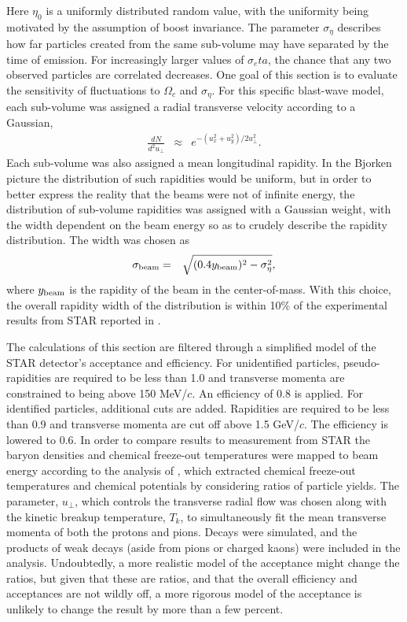 Here $\eta_0$ is a uniformly distributed random value, with the uniformity being motivated by the assumption of boost invariance. The parameter $\sigma_\eta$ describes how far particles created from the same sub-volume may have separated by the time of emission. For increasingly larger values of $\sigma_eta$, the chance that any two observed particles are correlated decreases.  One goal of this section is to evaluate the sensitivity of fluctuations to $\Omega_c$ and $\sigma_\eta$. For this specific blast-wave model, each sub-volume was assigned a radial transverse velocity according to a Gaussian,
\begin{eqnarray}
\frac{dN}{d^2u_\perp}&\approx&e^{-(u_x^2+u_y^2)/2u_\perp^2}.
\end{eqnarray}
Each sub-volume was also assigned a mean longitudinal rapidity. In the Bjorken picture the distribution of such rapidities would be uniform, but in order to better express the reality that the beams were not of infinite energy, the distribution of sub-volume rapidities was assigned with a Gaussian weight, with the width dependent on the beam energy so as to crudely describe the rapidity distribution. The width was chosen as 
\begin{eqnarray}
\sigma_{\rm beam}&=&\sqrt{(0.4y_{\rm beam})^2-\sigma_\eta^2},
\end{eqnarray}
where $y_{\rm beam}$ is the rapidity of the beam in the center-of-mass. With this choice, the overall rapidity width of the distribution is within 10\% of the experimental results from STAR reported in \cite{Flores:2016mtp}.

The calculations of this section are filtered through a simplified model of the STAR detector's acceptance and efficiency. For unidentified particles, pseudo-rapidities are required to be less than 1.0 and transverse momenta are constrained to being above 150 MeV/$c$. An efficiency of 0.8 is applied. For identified particles, additional cuts are added. Rapidities are required to be less than 0.9 and transverse momenta are cut off above 1.5 GeV/$c$. The efficiency is lowered to 0.6. In order to compare results to measurement from STAR the baryon densities and chemical freeze-out temperatures were mapped to beam energy according to the analysis of \cite{....}, which extracted chemical freeze-out temperatures and chemical potentials by considering ratios of particle yields. The parameter, $u_\perp$, which controls the transverse radial flow was chosen along with the kinetic breakup temperature, $T_k$, to simultaneously fit the mean transverse momenta of both the protons and pions. Decays were simulated, and the products of weak decays (aside from pions or charged kaons) were included in the analysis. Undoubtedly, a more realistic model of the acceptance might change the ratios, but given that these are ratios, and that the overall efficiency and acceptances are not wildly off, a more rigorous model of the acceptance is unlikely to change the result by more than a few percent.

